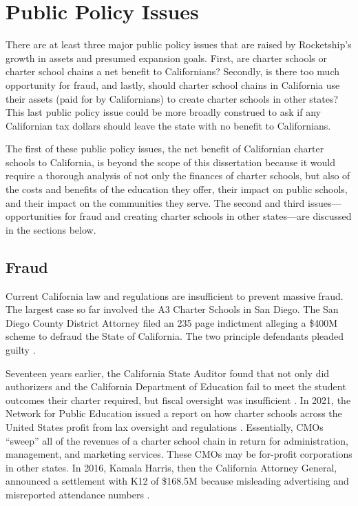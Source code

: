 \section{Public Policy Issues}%
\label{sec:publ-policy-chang}

There are at least three major public policy issues that are raised by Rocketship's growth in assets and presumed expansion goals. First, are charter schools or charter school chains a net benefit to Californians? Secondly, is there too much opportunity for fraud, and lastly, should charter school chains in California use their assets (paid for by Californians) to create charter schools in other states? This last public policy issue could be more broadly construed to ask if any Californian tax dollars should leave the state with no benefit to Californians.

The first of these public policy issues, the net benefit of Californian charter schools to California, is beyond the scope of this dissertation because it would require a thorough analysis of not only the finances of charter schools, but also of the costs and benefits of the education they offer, their impact on public schools, and their impact on the communities they serve. The second and third issues—opportunities for fraud and creating charter schools in other states—are discussed in the sections below.

\subsection{Fraud}%
\label{sec:fraud}%

Current California law and regulations are insufficient to prevent massive fraud. The largest case so far involved the A3 Charter Schools in San Diego. The San Diego County District Attorney filed an 235 page indictment \parencite{SDDA2019} alleging a \$400M scheme to defraud the State of California. The two principle defendants pleaded guilty \parencite{Taketa2021}.

Seventeen years earlier, the California State Auditor found that not only did authorizers and the California Department of Education fail to meet the student outcomes their charter required, but fiscal oversight was insufficient \parencite{CAStateAuditor2002}. In 2021, the Network for Public Education issued a report on how charter schools across the United States profit from lax oversight and regulations \parencite{Burris.Cimarusti2021}. Essentially, CMOs ``sweep'' all of the revenues of a charter school chain in return for administration, management, and marketing services. These CMOs may be for-profit corporations in other states. In 2016, Kamala Harris, then the California Attorney General, announced a settlement with K12 of \$168.5M because misleading advertising and misreported attendance numbers \parencite{AGpressoffice2016}.

